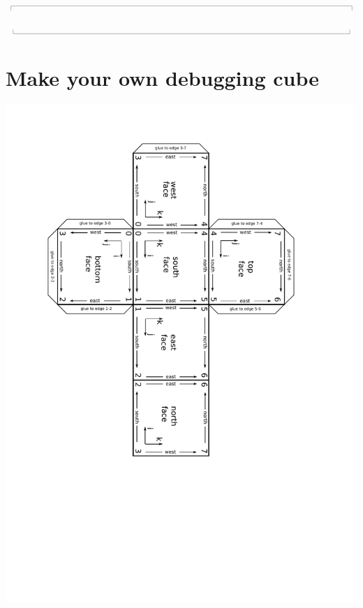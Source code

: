 \documentclass[12pt,a4paper,twoside]{article}
\newcommand{\topbar}{\ensuremath{
    \rule{0.1mm}{2.0mm} \rule[2.0mm]{159.5mm}{0.1mm} \rule{0.1mm}{2.0mm}
}}
\newcommand{\bottombar}{\ensuremath{
    \rule{0.1mm}{2.0mm} \rule{159.5mm}{0.1mm} \rule{0.1mm}{2.0mm}
}}
\begin{document}
\noindent
\topbar

\bottombar

\cleardoublepage


\cleardoublepage


\cleardoublepage
\section{Make your own debugging cube}
\label{cube-development}
%
\centerline{\includegraphics[viewport=69 220 490 778,clip=true,angle=180]{figs/paper-cube-development.pdf}}

%

\cleardoublepage
\end{document}
